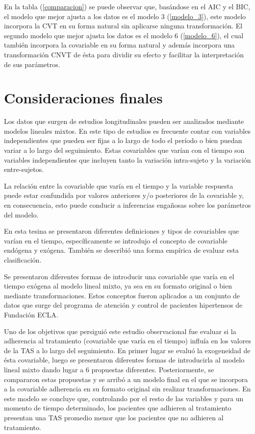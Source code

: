 \documentclass[spanish]{article}
\numberwithin{figure}{subsection}
\numberwithin{equation}{subsection}
\numberwithin{table}{subsection}
\begin{document}
En la tabla (\ref{comparacion}) se puede observar que, basándose en el AIC y el
BIC, el modelo que mejor ajusta a los datos es el modelo 3 (\ref{modelo_3}),
este modelo incorpora la CVT en su forma natural sin aplicarse ninguna
transformación. El segundo modelo que mejor ajusta los datos es el modelo 6
(\ref{modelo_6}), el cual también incorpora la covariable en su forma natural y
además incorpora una transformación CNVT de ésta para dividir su efecto y
facilitar la interpretación de sus parámetros.

\newpage

\section{Consideraciones finales}

Los datos que surgen de estudios longitudinales pueden ser analizados mediante
modelos lineales mixtos. En este tipo de estudios es frecuente contar con
variables independientes que pueden ser fijas a lo largo de todo el período o
bien puedan variar a lo largo del seguimiento. Estas covariables que varían con
el tiempo son variables independientes que incluyen tanto la variación
intra-sujeto y la variación entre-sujetos.

La relación entre la covariable que varía en el tiempo y la variable respuesta
puede estar confundida por valores anteriores y/o posteriores de la covariable
y, en consecuencia, esto puede conducir a inferencias engañosas sobre los
parámetros del modelo.

En esta tesina se presentaron diferentes definiciones y tipos de covariables que
varían en el tiempo, específicamente se introdujo el concepto de covariable
endógena y exógena. También se describió una forma empírica de evaluar esta
clasificación.

Se presentaron diferentes formas de introducir una covariable que varía en el
tiempo exógena al modelo lineal mixto, ya sea en su formato original o bien
mediante transformaciones. Estos conceptos fueron aplicados a un conjunto de
datos que surge del programa de atención y control de pacientes hipertensos de
Fundación ECLA.

Uno de los objetivos que persiguió este estudio observacional fue evaluar si la
adherencia al tratamiento (covariable que varía en el tiempo) influía en los
valores de la TAS a lo largo del seguimiento. En primer lugar se evaluó la
exogeneidad de ésta covariable, luego se presentaron diferentes formas de
introducirla al modelo lineal mixto dando lugar a 6 propuestas diferentes.
Posteriormente, se compararon estas propuestas y se arribó a un modelo final en
el que se incorpora a la covariable adherencia en su formato original sin
realizar transformaciones. En este modelo se concluye que, controlando por el
resto de las variables y para un momento de tiempo determinado, los pacientes
que adhieren al tratamiento presentan una TAS promedio menor que los pacientes
que no adhieren al tratamiento.
\end{document}
